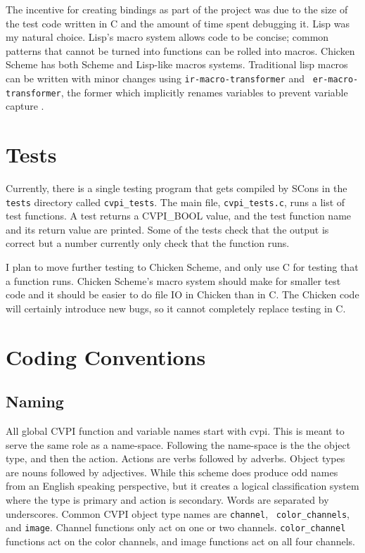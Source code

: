 \documentclass[12pt]{report}
\begin{document}
The incentive for creating bindings as part of the project was due to
the size of the test code written in C and the amount of time spent
debugging it. Lisp was my natural choice. Lisp's macro system allows
code to be concise; common patterns that cannot be turned into
functions can be rolled into macros. Chicken Scheme has both Scheme
and Lisp-like macros systems. Traditional lisp macros can be written
with minor changes using {\tt ir-macro-transformer} and {\tt
  er-macro-transformer}, the former which implicitly renames variables
to prevent variable capture \cite[./man/4/Macros]{chicken}.

\chapter{Tests}
\label{sec-10}
Currently, there is a single testing program that gets compiled by
SCons in the {\tt tests} directory called {\tt cvpi\_tests}. The main
file, {\tt cvpi\_tests.c}, runs a list of test functions. A test
returns a CVPI\_BOOL value, and the test function name and its return
value are printed. Some of the tests check that the output is correct
but a number currently only check that the function runs.

I plan to move further testing to Chicken Scheme, and only use C for
testing that a function runs. Chicken Scheme's macro system should
make for smaller test code and it should be easier to do file IO in
Chicken than in C. The Chicken code will certainly introduce new bugs,
so it cannot completely replace testing in C.

\chapter{Coding Conventions}
\label{sec-11}
\section{Naming}
\label{sec-11-1}
All global CVPI function and variable names start with cvpi. This is
meant to serve the same role as a name-space. Following the name-space
is the the object type, and then the action. Actions are verbs
followed by adverbs. Object types are nouns followed by
adjectives. While this scheme does produce odd names from an English
speaking perspective, but it creates a logical classification system where
the type is primary and action is secondary. Words are separated by
underscores. Common CVPI object type names are {\tt channel}, {\tt
  color\_channels}, and {\tt image}. Channel functions only act on
one or two channels. {\tt color\_channel} functions act on the
color channels, and image functions act on all four channels.
\end{document}
